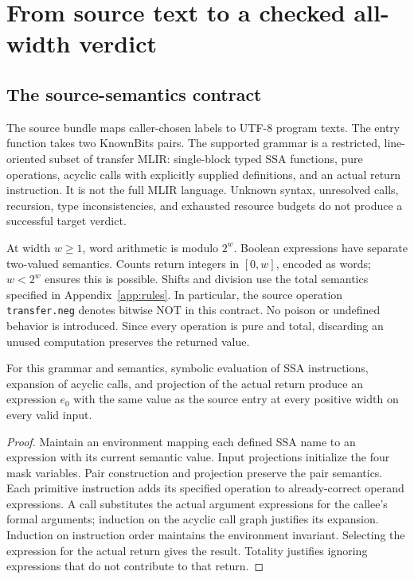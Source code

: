 \section{From source text to a checked all-width verdict}\label{sec:replay}

\subsection{The source-semantics contract}
The source bundle maps caller-chosen labels to UTF-8 program texts. The entry function takes two KnownBits pairs. The supported grammar is a restricted, line-oriented subset of transfer MLIR: single-block typed SSA functions, pure operations, acyclic calls with explicitly supplied definitions, and an actual return instruction. It is not the full MLIR language. Unknown syntax, unresolved calls, recursion, type inconsistencies, and exhausted resource budgets do not produce a successful target verdict.

At width $w\ge1$, word arithmetic is modulo $2^w$. Boolean expressions have separate two-valued semantics. Counts return integers in $[0,w]$, encoded as words; $w<2^w$ ensures this is possible. Shifts and division use the total semantics specified in Appendix~\ref{app:rules}. In particular, the source operation \texttt{transfer.neg} denotes bitwise NOT in this contract. No poison or undefined behavior is introduced. Since every operation is pure and total, discarding an unused computation preserves the returned value.

\begin{lemma}\label{lem:frontend}
For this grammar and semantics, symbolic evaluation of SSA instructions, expansion of acyclic calls, and projection of the actual return produce an expression $e_0$ with the same value as the source entry at every positive width on every valid input.
\end{lemma}
\begin{proof}
Maintain an environment mapping each defined SSA name to an expression with its current semantic value. Input projections initialize the four mask variables. Pair construction and projection preserve the pair semantics. Each primitive instruction adds its specified operation to already-correct operand expressions. A call substitutes the actual argument expressions for the callee's formal arguments; induction on the acyclic call graph justifies its expansion. Induction on instruction order maintains the environment invariant. Selecting the expression for the actual return gives the result. Totality justifies ignoring expressions that do not contribute to that return.
\end{proof}

